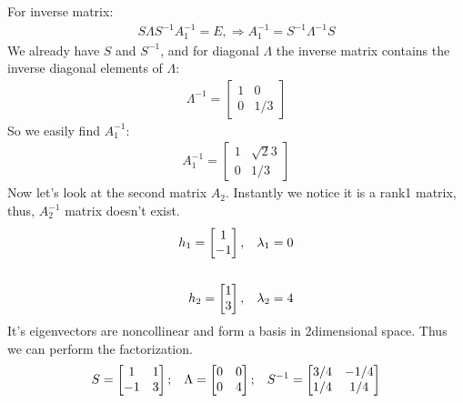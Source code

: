 \documentclass[letterpaper,10pt,english]{jupyterBook}
\begin{document}
For inverse matrix:
\begin{equation*}
\begin{split}
S\Lambda S^{-1} A_1^{-1} = E, \Rightarrow A_1^{-1} = S^{-1} \Lambda ^{-1} S
\end{split}
\end{equation*}
\sphinxAtStartPar
We already have \(S\) and \(S^{-1}\), and for diagonal \(\Lambda\) the inverse matrix contains the inverse diagonal elements of \(\Lambda\):
\begin{equation*}
\begin{split}
\Lambda ^{-1}= 
\begin{bmatrix}
1 & 0\\
0 & 1/3
\end{bmatrix}
\end{split}
\end{equation*}
\sphinxAtStartPar
So we easily find \(A_1^{-1}\):
\begin{equation*}
\begin{split}
A_1^{-1} = 
\begin{bmatrix}
1 & \sqrt{2}{3}\\
0 & 1/3
\end{bmatrix}
\end{split}
\end{equation*}
\sphinxAtStartPar
Now let’s look at the second matrix \(A_2\). Instantly we notice it is a rank\sphinxhyphen{}1 matrix, thus, \(A_2^{-1}\) matrix doesn’t exist.
\begin{equation*}
\begin{split}
h_1 = 
\begin{bmatrix}
1\\
-1
\end{bmatrix}
,\hspace{3mm}
\lambda_1 = 0
\\
\hspace{1mm}
\\
h_2 =
\begin{bmatrix}
1\\
3
\end{bmatrix}
,\hspace{3mm}
\lambda_2 = 4
\end{split}
\end{equation*}
\sphinxAtStartPar
It’s eigenvectors are non\sphinxhyphen{}collinear and form a basis in 2\sphinxhyphen{}dimensional space. Thus we can perform the factorization.
\begin{equation*}
\begin{split}
S = 
\begin{bmatrix}
1 & 1\\
-1 & 3
\end{bmatrix}
;\hspace{3mm}
\Lambda = 
\begin{bmatrix}
0 & 0\\
0 & 4
\end{bmatrix}
;\hspace{3mm}
S^{-1} =  
\begin{bmatrix}
3/4 & -1/4\\
1/4 & 1/4
\end{bmatrix}
\end{split}
\end{equation*}
\end{document}
